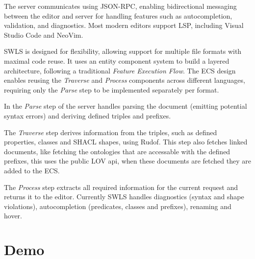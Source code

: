 The server communicates using JSON-RPC, enabling bidirectional messaging between the editor and server for handling features such as autocompletion, validation, and diagnostics. Most modern editors support LSP, including Visual Studio Code and NeoVim.

SWLS is designed for flexibility, allowing support for multiple file formats with maximal code reuse. It uses an entity component system to build a layered architecture\cite{10.1145/3550355.3552452}, following a traditional \textit{Feature Execution Flow}. The ECS design enables reusing the \textit{Traverse} and \textit{Process} components across different languages, requiring only the \textit{Parse} step to be implemented separately per format.


In the \textit{Parse} step of the server handles parsing the document (emitting potential syntax errors) and deriving defined triples and prefixes.

The \textit{Traverse} step derives information from the triples, such as defined properties, classes and SHACL shapes, using Rudof\cite{labra2022rudof}. 
This step also fetches linked documents, like fetching the ontologies that are accessable with the defined prefixes, this uses the public LOV api, when these documents are fetched they are added to the ECS.

The \textit{Process} step extracts all required information for the current request and returns it to the editor.
Currently SWLS handles diagnostics (syntax and shape violations), autocompletion (predicates, classes and prefixes), renaming and hover.
 

\section{Demo}


